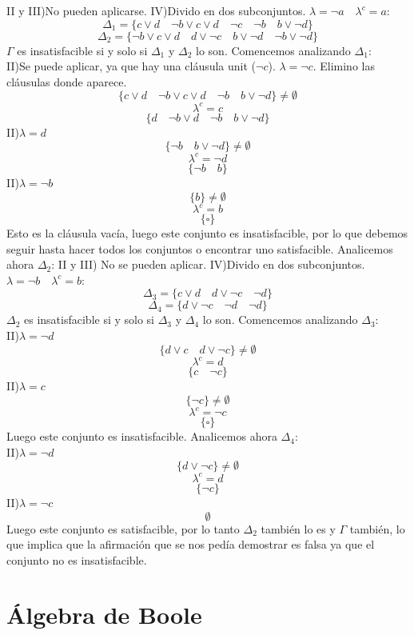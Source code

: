 \documentclass[a4paper]{article}
\begin{document}
II y III)No pueden aplicarse.
IV)Divido en dos subconjuntos. $\lambda=\neg a \quad \lambda^c=a$:
$$\Delta_1=\{c\lor d\quad \neg b\lor c\lor d\quad\neg c\quad\neg b\quad b\lor\neg d\}$$
$$\Delta_2=\{\neg b\lor c\lor d\quad d\lor\neg c\quad b\lor\neg d\quad\neg b\lor\neg d\}$$
$\Gamma$ es insatisfacible si y solo si $\Delta_1$ y $\Delta_2$ lo son. Comencemos analizando $\Delta_1$:\\
II)Se puede aplicar, ya que hay una cláusula unit ($\neg c$). $\lambda=\neg c$. Elimino las cláusulas donde aparece.
$$\{ c\lor d\quad\neg b\lor c\lor d\quad\neg b\quad b\lor\neg d \}\neq \emptyset$$
$$\lambda^c=c$$
$$\{d\quad\neg b\lor d\quad\neg b\quad b\lor\neg d\}$$
II)$\lambda=d$
$$\{\neg b\quad b\lor\neg d\}\neq\emptyset$$
$$\lambda^c=\neg d$$
$$\{\neg b\quad b\}$$
II)$\lambda=\neg b$
$$\{b\}\neq\emptyset$$
$$\lambda^c=b$$
$$\{\square\}$$
Esto es la cláusula vacía, luego este conjunto es insatisfacible, por lo que debemos seguir hasta hacer todos los conjuntos o encontrar uno satisfacible. Analicemos ahora $\Delta_2$:
II y III) No se pueden aplicar.
IV)Divido en dos subconjuntos. $\lambda=\neg b \quad \lambda^c=b$:
$$\Delta_3=\{c\lor d\quad d\lor\neg c\quad\neg d\}$$
$$\Delta_4=\{d\lor\neg c\quad\neg d\quad\neg d\}$$
$\Delta_2$ es insatisfacible si y solo si $\Delta_3$ y $\Delta_4$ lo son. Comencemos analizando $\Delta_3$:\\
II)$\lambda=\neg d$
$$\{d\lor c\quad d\lor\neg c\}\neq\emptyset$$
$$\lambda^c=d$$
$$\{c\quad\neg c\}$$
II)$\lambda=c$
$$\{\neg c\}\neq\emptyset$$
$$\lambda^c=\neg c$$
$$\{\square\}$$
Luego este conjunto es insatisfacible. Analicemos ahora $\Delta_4$:\\
II)$\lambda=\neg d$
$$\{d\lor\neg c\}\neq\emptyset$$
$$\lambda^c=d$$
$$\{\neg c\}$$
II)$\lambda=\neg c$
$$\emptyset$$
Luego este conjunto es satisfacible, por lo tanto $\Delta_2$ también lo es y $\Gamma$ también, lo que implica que la afirmación que se nos pedía demostrar es falsa ya que el conjunto no es insatisfacible.

\section{Álgebra de Boole}
\end{document}
